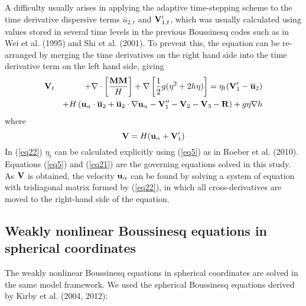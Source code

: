 \documentclass[11pt]{article}
\newcommand{\be}{\begin{equation}}
\newcommand{\ee}{\end{equation}}
\newcommand{\ba}{\begin{eqnarray}}
\newcommand{\ea}{\end{eqnarray}}
\newcommand{\ua}{{\bf u}_\alpha}
\newcommand{\utwo}{\overline{\bf u}_2}
\begin{document}
A difficulty usually arises in applying the adaptive time-stepping scheme to the time derivative dispersive terms  $\bar{u}_{2,t}$ and ${\bf V}_{1,t}^\prime$, which was usually calculated using values stored in several time levels in the previous Boussinesq codes such as in Wei et al. (1995) and Shi et al. (2001).   To prevent this, the equation can be re-arranged by merging the time derivatives on the right hand side into the time derivative term on the left hand side, giving  
\ba
     {\bf V}_t &&+ \nabla \cdot \left [\frac{ {\bf M} {\bf M}}{H} \right] + \nabla \left [ \frac{1}{2} g (\eta^2 +2 h \eta) \right ]  =  
   \eta_t ({\bf V}_1^{\prime} -  \utwo ) \\
 \nonumber   &&+ H \left (  \ua \cdot \utwo + \utwo \cdot \nabla \ua  - {\bf V}_1^{\prime \prime} - {\bf V}_2 -{\bf V}_3  - {\bf R} \right )    + g \eta \nabla h 
\label{eq22}
\ea
where
\be
{\bf V} = H (  \ua + {\bf V}_1^\prime) \label{eq23}
\ee
In (\ref{eq22}) $\eta_t$ can be calculated explicitly using (\ref{eq5}) as  in Roeber et al. (2010). Equations  (\ref{eq5}) and (\ref{eq21}) are  the governing equations solved in this study.  As ${\bf V}$ is obtained, the velocity $\ua$ can be found by solving a system of equation with tridiagonal matrix  formed by (\ref{eq22}),  in which all cross-derivatives are moved to the right-hand side of the equation.  

\subsection{Weakly nonlinear Boussinesq equations in spherical coordinates}

The weakly nonlinear Boussinesq equations in spherical coordinates are solved in the same model framework. We used the spherical 
Boussinesq equations  derived by  Kirby et al.  (2004, 2012):
\end{document}
